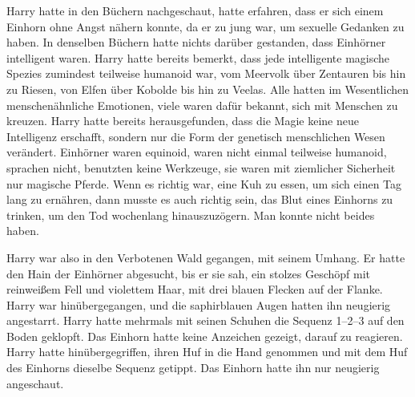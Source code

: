 Harry hatte in den Büchern nachgeschaut, hatte erfahren, dass er sich einem Einhorn ohne Angst nähern konnte, da er zu jung war, um sexuelle Gedanken zu haben. In denselben Büchern hatte nichts darüber gestanden, dass Einhörner intelligent waren. Harry hatte bereits bemerkt, dass jede intelligente magische Spezies zumindest teilweise humanoid war, vom Meervolk über Zentauren bis hin zu Riesen, von Elfen über Kobolde bis hin zu Veelas. Alle hatten im Wesentlichen menschenähnliche Emotionen, viele waren dafür bekannt, sich mit Menschen zu kreuzen. Harry hatte bereits herausgefunden, dass die Magie keine neue Intelligenz erschafft, sondern nur die Form der genetisch menschlichen Wesen verändert. Einhörner waren equinoid, waren nicht einmal teilweise humanoid, sprachen nicht, benutzten keine Werkzeuge, sie waren mit ziemlicher Sicherheit nur magische Pferde. Wenn es richtig war, eine Kuh zu essen, um sich einen Tag lang zu ernähren, dann musste es auch richtig sein, das Blut eines Einhorns zu trinken, um den Tod wochenlang hinauszuzögern. Man konnte nicht beides haben.

Harry war also in den Verbotenen Wald gegangen, mit seinem Umhang. Er hatte den Hain der Einhörner abgesucht, bis er sie sah, ein stolzes Geschöpf mit reinweißem Fell und violettem Haar, mit drei blauen Flecken auf der Flanke. Harry war hinübergegangen, und die saphirblauen Augen hatten ihn neugierig angestarrt. Harry hatte mehrmals mit seinen Schuhen die Sequenz 1–2–3 auf den Boden geklopft.
Das Einhorn hatte keine Anzeichen gezeigt, darauf zu reagieren. Harry hatte hinübergegriffen, ihren Huf in die Hand genommen und mit dem Huf des Einhorns dieselbe Sequenz getippt. Das Einhorn hatte ihn nur neugierig angeschaut.

